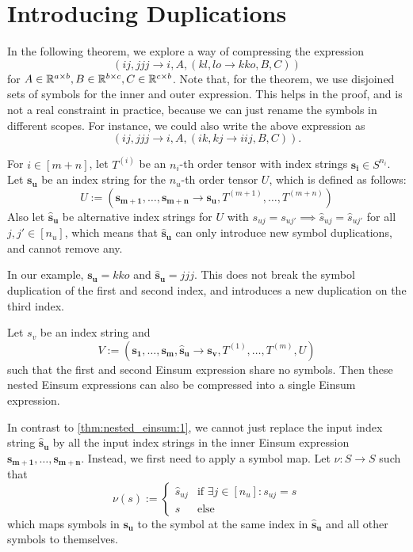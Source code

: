 \section{Introducing Duplications}

In the following theorem, we explore a way of compressing the expression
$$(ij, jjj \rightarrow i, A, (kl, lo \rightarrow kko, B, C))$$
for $A \in \mathbb{R}^{a \times b}, B \in \mathbb{R}^{b \times c}, C \in \mathbb{R}^{c \times b}$.
Note that, for the theorem, we use disjoined sets of symbols for the inner and outer expression.
This helps in the proof, and is not a real constraint in practice,
because we can just rename the symbols in different scopes.
For instance, we could also write the above expression as
$$(ij, jjj \rightarrow i, A, (ik, kj \rightarrow iij, B, C)).$$

\begin{theorem}
    \label{thm:nested_einsum:2}

    For $i \in [m + n]$, let $T^{(i)}$ be an $n_i$-th order tensor with index strings $\bm{s_i} \in S^{n_i}$.
    Let $\bm{s_u}$ be an index string for the $n_u$-th order tensor $U$, which is defined as follows:
    $$U := (\bm{s_{m + 1}},\dots,\bm{s_{m + n}} \rightarrow \bm{s_u}, T^{(m + 1)},\dots,T^{(m + n)})$$
    Also let $\bm{\hat{s}_u}$ be alternative index strings for $U$ with $s_{uj} = s_{uj'} \implies \hat{s}_{uj} = \hat{s}_{uj'}$ for all $j, j' \in [n_u]$,
    which means that $\bm{\hat{s}_u}$ can only introduce new symbol duplications, and cannot remove any.

    In our example, $\bm{s_u} = kko$ and $\bm{\hat{s}_u} = jjj$.
    This does not break the symbol duplication of the first and second index,
    and introduces a new duplication on the third index.

    Let $s_v$ be an index string and
    $$V := (\bm{s_1},\dots,\bm{s_m}, \bm{\hat{s}_u} \rightarrow \bm{s_v}, T^{(1)},\dots,T^{(m)}, U)$$
    such that the first and second Einsum expression share no symbols.
    Then these nested Einsum expressions can also be compressed into a single Einsum expression.

    In contrast to \autoref{thm:nested_einsum:1}, we cannot just replace the input index string $\bm{\hat{s}_u}$ by all the input index strings in the inner Einsum expression $\bm{s_{m + 1}},\dots,\bm{s_{m + n}}$.
    Instead, we first need to apply a symbol map.
    Let $\nu: S \rightarrow S$ such that
    $$\nu(s) := \begin{cases}
            \hat{s}_{uj} & \text{if }\exists j \in [n_u]: s_{uj} = s \\
            s            & \text{else}
        \end{cases}$$
    which maps symbols in $\bm{s_u}$ to the symbol at the same index in $\bm{\hat{s}_u}$ and all other symbols to themselves.


\end{theorem}
